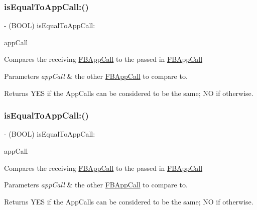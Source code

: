 \subsubsection{\texorpdfstring{is\+Equal\+To\+App\+Call\+:()}{isEqualToAppCall:()}\hspace{0.1cm}{\footnotesize\ttfamily [3/5]}}
{\footnotesize\ttfamily -\/ (B\+O\+OL) is\+Equal\+To\+App\+Call\+: \begin{DoxyParamCaption}\item[{(\hyperlink{interfaceFBAppCall}{F\+B\+App\+Call} $\ast$)}]{app\+Call }\end{DoxyParamCaption}}

Compares the receiving \hyperlink{interfaceFBAppCall}{F\+B\+App\+Call} to the passed in \hyperlink{interfaceFBAppCall}{F\+B\+App\+Call}


\begin{DoxyParams}{Parameters}
{\em app\+Call} & the other \hyperlink{interfaceFBAppCall}{F\+B\+App\+Call} to compare to.\\
\hline
\end{DoxyParams}
\begin{DoxyReturn}{Returns}
Y\+ES if the App\+Calls can be considered to be the same; NO if otherwise. 
\end{DoxyReturn}
\mbox{\label{interfaceFBAppCall_a4baed85de4c4f827874a7db76a2040b3}} 
\subsubsection{\texorpdfstring{is\+Equal\+To\+App\+Call\+:()}{isEqualToAppCall:()}\hspace{0.1cm}{\footnotesize\ttfamily [4/5]}}
{\footnotesize\ttfamily -\/ (B\+O\+OL) is\+Equal\+To\+App\+Call\+: \begin{DoxyParamCaption}\item[{(\hyperlink{interfaceFBAppCall}{F\+B\+App\+Call} $\ast$)}]{app\+Call }\end{DoxyParamCaption}}

Compares the receiving \hyperlink{interfaceFBAppCall}{F\+B\+App\+Call} to the passed in \hyperlink{interfaceFBAppCall}{F\+B\+App\+Call}


\begin{DoxyParams}{Parameters}
{\em app\+Call} & the other \hyperlink{interfaceFBAppCall}{F\+B\+App\+Call} to compare to.\\
\hline
\end{DoxyParams}
\begin{DoxyReturn}{Returns}
Y\+ES if the App\+Calls can be considered to be the same; NO if otherwise. 
\end{DoxyReturn}
\mbox{\label{interfaceFBAppCall_a4baed85de4c4f827874a7db76a2040b3}} 
